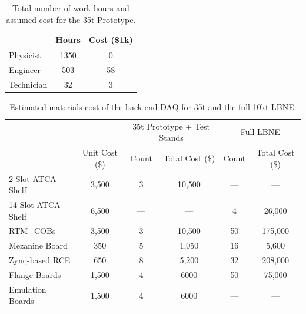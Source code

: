 \begin{table}[tbh]
\begin{center}
\begin{tabular}{|l|c|c|}   
\hline \hline 
    & Hours  & Cost (\$1k) \\      
\hline
   Physicist           & 1350 &0 \\ 
   Engineer           & 503   &58 \\ 
   Technician        & 32    &3\\ 
\hline \hline
\end{tabular}
\caption[]{Total number of work hours and assumed cost for the 35t Prototype.}
\label{tab:labor} 
\end{center}
\end{table}





\begin{table}[tbh]
\begin{center}
\begin{tabular}{|l|c|cc|cc|}   
\hline \hline 
						 			 &         & \multicolumn{2}{|c|}{35t  Prototype + Test Stands} &\multicolumn{2}{|c|}{Full LBNE }    \\      
									 & Unit Cost (\$)& Count &  Total Cost (\$) & Count &  Total Cost  (\$)\\      
\hline
   2-Slot ATCA Shelf    & 3,500              &  3         &    10,500     &  ---  &  ---  \\ 
  14-Slot ATCA Shelf   & 6,500              &  ---         &    ---    &  4  &  26,000  \\ 
     RTM+COBs             & 3,500              &  3         &    10,500     &    50   &   175,000\\ 
   Mezanine Board     & 350                &  5         &       1,050    &  16   &  5,600 \\ 
   Zynq-based RCE	   & 650                &  8          &   5,200        &   32    &208,000\\ 
   Flange Boards          & 1,500              &  4          &  6000        & 50          & 75,000\\ 
   Emulation Boards     & 1,500              &  4          &  6000        &  ---        &    ---  \\ 
\hline \hline
\end{tabular}
\caption[]{Estimated materials cost of the back-end DAQ for 35t and the full 10kt LBNE.}
\label{tab:mats} 
\end{center}
\end{table}

